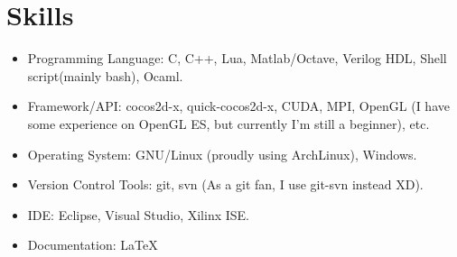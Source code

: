 \documentclass[letterpaper]{article}
\begin{document}


\section*{Skills}
\begin{itemize}
\item Programming Language: C, C++, Lua, Matlab/Octave, Verilog HDL, Shell script(mainly bash), Ocaml.
\item Framework/API: cocos2d-x, quick-cocos2d-x, CUDA, MPI, OpenGL (I have some experience on OpenGL ES, but currently I'm still a beginner), etc.
\item Operating System: GNU/Linux (proudly using ArchLinux), Windows.
\item Version Control Tools: git, svn (As a git fan, I use git-svn instead XD).
\item IDE: Eclipse, Visual Studio, Xilinx ISE.
\item Documentation: \LaTeX
\end{itemize}
\end{document}
